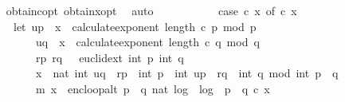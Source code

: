 \begin{isabellebody}
\ \ \ \ \isamarkupfalse%
\ obtain{\isacharunderscore}{\kern0pt}c{\isacharunderscore}{\kern0pt}opt{}\ obtain{\isacharunderscore}{\kern0pt}x{\isacharunderscore}{\kern0pt}opt{}\ \isamarkupfalse%
\ auto\isanewline
\isanewline
\ \ \isamarkupfalse%
\ \isamarkupfalse%
\ {\isachardoublequoteopen}{\isachardot}{\kern0pt}{\isachardot}{\kern0pt}{\isachardot}{\kern0pt}\ {\isacharequal}{\kern0pt}\isanewline
\ \ \ \ {\isacharparenleft}{\kern0pt}case\ {\isacharparenleft}{\kern0pt}c{\isacharcomma}{\kern0pt}\ x{\isacharparenright}{\kern0pt}\ of\ {\isacharparenleft}{\kern0pt}c{\isacharcomma}{\kern0pt}\ x{\isacharparenright}{\kern0pt}\ {\isasymRightarrow}\isanewline
\ \ \ \ \ \ \ let\ u{\isacharunderscore}{\kern0pt}p\ {\isacharequal}{\kern0pt}\ x\ {\isacharcircum}{\kern0pt}\ calculate{\isacharunderscore}{\kern0pt}exponent\ {\isacharparenleft}{\kern0pt}length\ c{\isacharparenright}{\kern0pt}\ p\ mod\ p{\isacharsemicolon}{\kern0pt}\ \isanewline
\ \ \ \ \ \ \ \ \ \ \ u{\isacharunderscore}{\kern0pt}q\ {\isacharequal}{\kern0pt}\ x\ {\isacharcircum}{\kern0pt}\ calculate{\isacharunderscore}{\kern0pt}exponent\ {\isacharparenleft}{\kern0pt}length\ c{\isacharparenright}{\kern0pt}\ q\ mod\ q{\isacharsemicolon}{\kern0pt}\isanewline
\ \ \ \ \ \ \ \ \ \ \ {\isacharparenleft}{\kern0pt}{\isacharparenleft}{\kern0pt}r{\isacharunderscore}{\kern0pt}p{\isacharcomma}{\kern0pt}\ r{\isacharunderscore}{\kern0pt}q{\isacharparenright}{\kern0pt}{\isacharcomma}{\kern0pt}\ {\isacharunderscore}{\kern0pt}{\isacharparenright}{\kern0pt}\ {\isacharequal}{\kern0pt}\ euclid{\isacharunderscore}{\kern0pt}ext\ {\isacharparenleft}{\kern0pt}int\ p{\isacharparenright}{\kern0pt}\ {\isacharparenleft}{\kern0pt}int\ q{\isacharparenright}{\kern0pt}{\isacharsemicolon}{\kern0pt}\isanewline
\ \ \ \ \ \ \ \ \ \ \ x{\isacharunderscore}{\kern0pt}{}\ {\isacharequal}{\kern0pt}\ nat\ {\isacharparenleft}{\kern0pt}{\isacharparenleft}{\kern0pt}int\ u{\isacharunderscore}{\kern0pt}q\ {\isacharasterisk}{\kern0pt}\ r{\isacharunderscore}{\kern0pt}p\ {\isacharasterisk}{\kern0pt}\ int\ p\ {\isacharplus}{\kern0pt}\ int\ u{\isacharunderscore}{\kern0pt}p\ {\isacharasterisk}{\kern0pt}\ r{\isacharunderscore}{\kern0pt}q\ {\isacharasterisk}{\kern0pt}\ int\ q{\isacharparenright}{\kern0pt}\ mod\ int\ {\isacharparenleft}{\kern0pt}p\ {\isacharasterisk}{\kern0pt}\ q{\isacharparenright}{\kern0pt}{\isacharparenright}{\kern0pt}{\isacharsemicolon}{\kern0pt}\isanewline
\ \ \ \ \ \ \ \ \ \ \ {\isacharparenleft}{\kern0pt}m{\isacharcomma}{\kern0pt}\ x{\isacharprime}{\kern0pt}{\isacharparenright}{\kern0pt}\ {\isacharequal}{\kern0pt}\ enc{\isacharunderscore}{\kern0pt}loop{\isacharunderscore}{\kern0pt}alt\ {\isacharparenleft}{\kern0pt}p\ {\isacharasterisk}{\kern0pt}\ q{\isacharcomma}{\kern0pt}\ nat\ {\isasymlfloor}log\ {}\ {\isacharparenleft}{\kern0pt}log\ {}\ {\isacharparenleft}{\kern0pt}p\ {\isacharasterisk}{\kern0pt}\ q{\isacharparenright}{\kern0pt}{\isacharparenright}{\kern0pt}{\isasymrfloor}{\isacharcomma}{\kern0pt}\ c{\isacharparenright}{\kern0pt}\ x{\isacharunderscore}{\kern0pt}{}\isanewline

\end{isabellebody}
